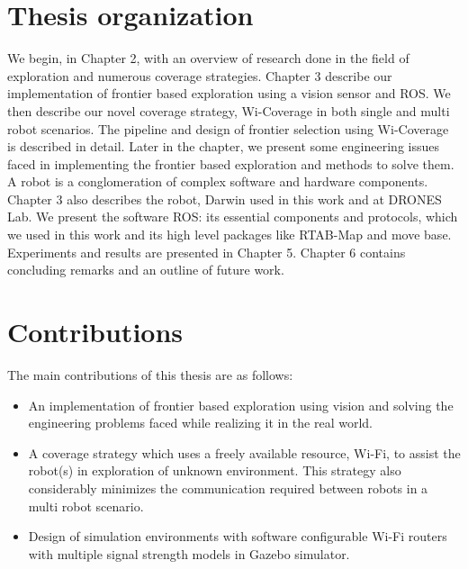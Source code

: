 \section{Thesis organization}    
We begin, in Chapter 2, with an overview of research done in the field of exploration and numerous coverage strategies. Chapter 3 describe our implementation of frontier based exploration using a vision sensor and ROS. We then describe our novel coverage strategy, Wi-Coverage in both single and multi robot scenarios. The pipeline and design of frontier selection using Wi-Coverage is described in detail. Later in the chapter, we present some engineering issues faced in implementing the frontier based exploration and methods to solve them. 
A robot is a conglomeration of complex software and hardware components. Chapter 3 also describes the robot, Darwin used in this work and at DRONES Lab. We present the software ROS: its essential components and protocols, which we used in this work and its high level packages like RTAB-Map and move base. Experiments and results are presented in Chapter 5. Chapter 6 contains concluding remarks and an outline of future work. 

\section{Contributions}
The main contributions of this thesis are as follows:
\begin{itemize}
    \item An implementation of frontier based exploration using vision and solving the engineering problems faced while realizing it in the real world.
    \item A coverage strategy which uses a freely available resource, Wi-Fi, to assist the robot(s) in exploration of unknown environment. This strategy also considerably minimizes the communication required between robots in a multi robot scenario.
    \item Design of simulation environments with software configurable Wi-Fi routers with multiple signal strength models in Gazebo simulator.
\end{itemize}